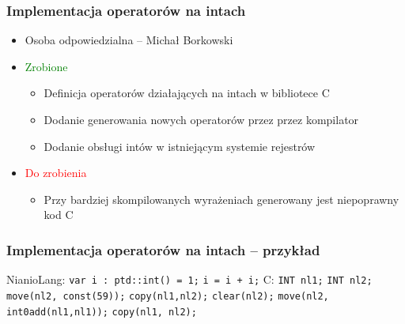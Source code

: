 \documentclass{beamer}
\begin{document}
	\begin{frame}
		\frametitle{Implementacja operatorów na intach}
		\begin{itemize}
			\item Osoba odpowiedzialna -- Michał Borkowski
			\item\textcolor{green}{Zrobione}
			\begin{itemize}
				\item Definicja operatorów działających na intach w bibliotece C
				\item Dodanie generowania nowych operatorów przez przez kompilator
				\item Dodanie obsługi intów w istniejącym systemie rejestrów
			\end{itemize}
			\item\textcolor{red}{Do zrobienia}
			\begin{itemize}
				\item Przy bardziej skompilowanych wyrażeniach generowany jest niepoprawny kod C
			\end{itemize}
		\end{itemize}
	\end{frame}
	
	\begin{frame}
		\frametitle{Implementacja operatorów na intach -- przykład}
		NianioLang:\newline
		\texttt{var i : ptd::int() = 1;}\newline
		\texttt{i = i + i;}\newline
		\newline
		C:\newline
		\texttt{INT nl1;}\newline
		\texttt{INT nl2;}\newline
		\texttt{move(nl2, const(59));}\newline
		\texttt{copy(nl1,nl2);}\newline
		\texttt{clear(nl2);}\newline
		\texttt{move(nl2, int0add(nl1,nl1));}\newline
		\texttt{copy(nl1, nl2);}\newline
	\end{frame}
	
\end{document}
